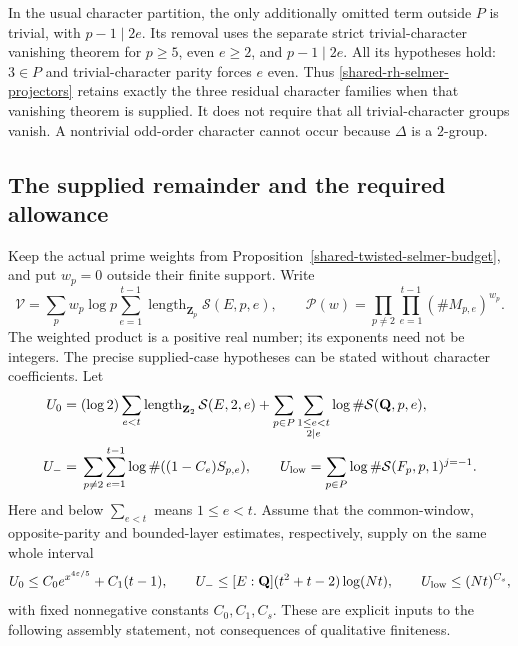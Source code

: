 In the usual character partition, the only additionally omitted term
outside \(P\) is trivial, with \(p-1\mid2e\). Its removal uses the
separate strict trivial-character vanishing theorem for
\(p\ge5\), even \(e\ge2\), and \(p-1\mid2e\).
All its hypotheses hold: \(3\in P\) and trivial-character parity
forces \(e\) even. Thus \eqref{shared-rh-selmer-projectors} retains
exactly the three residual character families when that vanishing
theorem is supplied. It does not require that all trivial-character
groups vanish. A nontrivial odd-order character cannot occur because
\(\Delta\) is a \(2\)-group.

\subsection{The supplied remainder and the required allowance}
\label{shared-rh-selmer-allowance}

Keep the actual prime weights from
Proposition~\ref{shared-twisted-selmer-budget}, and put \(w_p=0\)
outside their finite support. Write
\[
 \mathcal V=\sum_p w_p\log p\sum_{e=1}^{t-1}
                  \operatorname{length}_{\mathbf Z_p}\mathcal S(E,p,e),
 \qquad
 \mathcal P(w)=\prod_{p\ne2}\prod_{e=1}^{t-1}(\#M_{p,e})^{w_p}.
\]
The weighted product is a positive real number; its exponents need not
be integers. The precise supplied-case hypotheses can be stated without
character coefficients. Let
\[
\begin{split}
 U_0={}&(\log2)\sum_{e<t}\operatorname{length}_{\mathbf Z_2}
                       \mathcal S(E,2,e)
       +\sum_{p\in P}\sum_{\substack{1\le e<t\\2\mid e}}
                            \log\#\mathcal S(\mathbf Q,p,e),\\
 U_-={}&\sum_{p\ne2}\sum_{e=1}^{t-1}\log\#((1-C_e)S_{p,e}),
 \qquad
 U_{\rm low}=\sum_{p\in P}\log\#\mathcal S(F_p,p,1)^{j=-1}.
\end{split}
\]
Here and below \(\sum_{e<t}\) means \(1\le e<t\).
Assume that the common-window, opposite-parity and bounded-layer
estimates, respectively, supply on the same whole interval
\begin{equation}\label{shared-rh-supplied-cases}
 U_0\le C_0e^{x^{4\varepsilon/5}}+C_1(t-1),\qquad
 U_-\le [E:\mathbf Q](t^2+t-2)\log(Nt),\qquad
 U_{\rm low}\le(Nt)^{C_s},
\end{equation}
with fixed nonnegative constants \(C_0,C_1,C_s\). These are explicit
inputs to the following assembly statement, not consequences of
qualitative finiteness.

